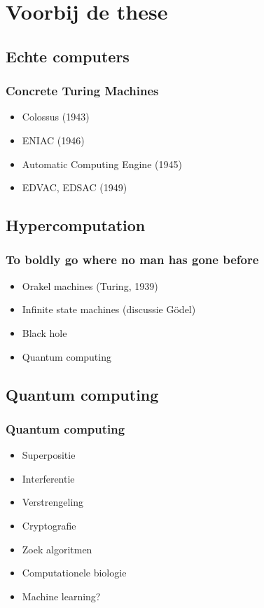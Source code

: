 \documentclass{beamer}
\begin{document}
\section{Voorbij de these}
\subsection{Echte computers}
\begin{frame}{}
    \frametitle{Concrete Turing Machines}
    \begin{itemize}
        \item<2-> Colossus (1943)
        \item<3-> ENIAC (1946)
        \item<4-> Automatic Computing Engine (1945)
        \item<5-> EDVAC, EDSAC (1949)
    \end{itemize}

\end{frame}

\subsection{Hypercomputation}
\begin{frame}{}
    \frametitle{To boldly go where no man has gone before}

    \begin{itemize}
        \item<2-> Orakel machines (Turing, 1939)
        \item<3-> Infinite state machines (discussie Gödel)
        \item<4-> Black hole
        \item<5-> Quantum computing 
    \end{itemize}
\end{frame}

\subsection{Quantum computing}
\begin{frame}
    \frametitle{Quantum computing}

    \begin{itemize}
        \item<2-> Superpositie
        \item<3-> Interferentie
        \item<4-> Verstrengeling
    \end{itemize}

    \vspace{0.5cm}
    \begin{itemize}
        \item<6-> Cryptografie
        \item<7-> Zoek algoritmen
        \item<8-> Computationele biologie
        \item<9-> Machine learning?
    \end{itemize}
\end{frame}
\end{document}
